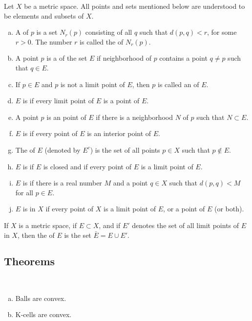\begin{definition}
	Let $X$ be a metric space. All points and sets mentioned below are understood to be elements and subsets of $X$.
	\begin{enumerate}[(a)]
		\item A {} of $p$ is a set $N_r(p)$ consisting of all $q$ such that $d(p,q) < r$, for some $r > 0$. The number $r$ is called the {} of $N_r(p)$.
		\item A point $p$ is a {} of the set $E$ if {} neighborhood of $p$ contains a point $q \ne p$ such that $q \in E$.
		\item If $p \in E$ and $p$ is not a limit point of $E$, then $p$ is called an {}  of $E$.
		\item $E$ is {} if every limit point of $E$ is a point of $E$.
		\item A point $p$ is an {} point of $E$ if there is a neighborhood $N$ of $p$ such that $N \subset E$.
		\item $E$ is {} if every point of $E$ is an interior point of $E$.
		\item The {} of $E$ (denoted by $E^c$) is the set of all points $p \in X$ such that $p \notin E$.
		\item $E$ is {} if $E$ is closed and if every point of $E$ is a limit point of $E$.
		\item $E$ is {} if there is a real number $M$ and a point $q \in X$ such that $d(p,q) < M$ for all $p \in E$.
		\item $E$ is {} in $X$ if every point of $X$ is a limit point of $E$, or a point of $E$ (or both).
	\end{enumerate}
\end{definition}

\begin{definition}
If $X$ is a metric space, if $E \subset X$, and if $E'$ denotes the set of all limit points of $E$ in $X$, then the {} of $E$ is the set $\bar E = E \cup E'$.
\end{definition}

\subsection{Theorems}
\begin{theorem}
	~
	\begin{enumerate}[(a)]
	\item Balls are convex.
	\item K-cells are convex.
	\end{enumerate}
\end{theorem}

